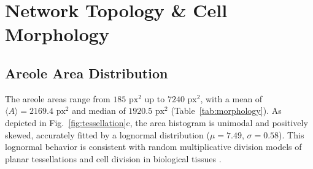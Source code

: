 \documentclass[10pt,twocolumn]{article}
\begin{document}
\begin{table}[t!]
\centering
\small
{}
\caption{\textbf{Summary of leaf morphology and areole network statistics.}}
\label{tab:morphology}
\end{table}

\section{Network Topology \& Cell Morphology}
\label{sec:topology}

\subsection{Areole Area Distribution}
The areole areas range from $185\text{ px}^2$ up to $7240\text{ px}^2$, with a mean of $\langle A \rangle = 2169.4\text{ px}^2$ and median of $1920.5\text{ px}^2$ (Table~\ref{tab:morphology}). As depicted in Fig.~\ref{fig:tessellation}c, the area histogram is unimodal and positively skewed, accurately fitted by a lognormal distribution ($\mu = 7.49$, $\sigma = 0.58$). This lognormal behavior is consistent with random multiplicative division models of planar tessellations and cell division in biological tissues \cite{corson2009turning}.
\end{document}
